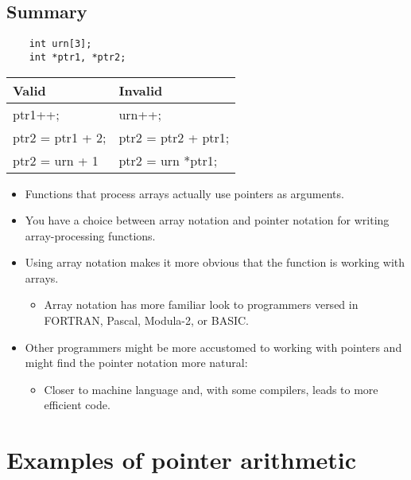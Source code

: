 \subsection{Summary}
\begin{verbatim}
    int urn[3]; 
    int *ptr1, *ptr2;
\end{verbatim}
\begin{center}
    \begin{tabular}{ |p{7cm}|p{7cm}| }
        \hline
            Valid & Invalid \\
        \hline
            ptr1++;  & urn++; \\ 
            ptr2 = ptr1 + 2; & ptr2 = ptr2 + ptr1; \\ 
            ptr2 = urn + 1 & ptr2 = urn *ptr1; \\ 
        \hline
    \end{tabular}
\end{center}
\begin{itemize}
    \item Functions that process arrays actually use pointers as arguments. 
    \item You have a choice between array notation and pointer notation for writing array-processing functions.
    \item Using array notation makes it more obvious that the function is working with arrays.
        \begin{itemize}
            \item Array notation has more familiar  look to programmers versed in FORTRAN, Pascal, Modula-2, or BASIC. 
        \end{itemize}
    
    \item Other programmers might be more accustomed to working with pointers and might find the pointer notation more natural:
        \begin{itemize}
            \item Closer to machine language and, with some compilers, leads to more efficient code. 
        \end{itemize}
\end{itemize}

\section{Examples of pointer arithmetic}


